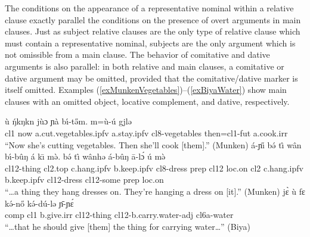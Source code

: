 \documentclass[10pt,twoside]{article}
\makeatletter
\def\ci#1{{\ipaFont #1}}
\newcommand{\gl}[1]{`#1'}
\newcommand{\cl}[1]{{\sc cl#1}}
\newcommand{\pref}[1]{(\ref{#1})}
\newcommand{\rref}[2]{\pref{#1}--\pref{#2}}
\def\ML#1{#1\symbol{"1DC6}} %
\def\LM{\textlowrise}
\newcommand\Lbi{\ipabar{\ipaclap{\i}{\rotatebox{0}{\emph{\raisebox{.06em}{\`{}}}}}}{.5ex}{1.1}{}{}}
\newcommand\Hbi{\ipabar{\ipaclap{\i}{\rotatebox{0}{\emph{\raisebox{.06em}{\'{}}}}}}{.5ex}{1.1}{}{}}
\renewcommand{\i}{ı}
\def\@{ə}
\def\eh{ɛ}
\def\aw{ɔ}
\def\ng{ŋ}
\def\ny{ɲ}
\makeatother
\begin{document}
The conditions on the appearance of a representative nominal
within a relative clause exactly parallel the conditions on the presence
of overt arguments in main clauses.
Just as subject relative clauses are the only type of relative clause which
must contain a representative nominal, subjects are the only argument
which is not omissible from a main clause.
The behavior of comitative and dative arguments is also parallel: in
both relative and main clauses, a comitative or dative argument may be
omitted, provided that the comitative/dative
%
marker is itself omitted. Examples \rref{exMunkenVegetables}{exBiyaWater}
show main clauses with an omitted object, locative complement, and dative,
respectively.
%
%
\begin{exe}
\ex \label{exMunkenVegetables}
\gll \`u {\'\ng}k\Hbi\ng{k\Lbi}n j\`u{\aw} \ny\`a b\'\i-t\H{\@}m. m=\`u-\'u gj\LM{\eh}l{\@}	\\
\cl1 now a.cut.vegetables.{\sc ipfv} a.stay.{\sc ipfv} \cl8-vegetables then=\cl1-{\sc fut} a.cook.{\sc irr}	\\
\glt ``Now she's cutting vegetables. Then she'll cook [them].'' (Munken) \label{mg04} %
\ex	\label{exMunkenDresses}
%
\gll \'a-\ny\H{\i} b\'{\@} t\^{\i} w\^an b\'\i-b\^u{\ng} \'a k\={\i} m\`{\@}. b\'{\@} t\^{\i} w\^anh{\@}
\'a-b\^u{\ng} \=a-l\'{\aw} \'u{\footnotemark}  m\`{\@}	\\
\cl12-thing \cl2.{\sc top} c.hang.{\sc ipfv} b.keep.{\sc ipfv} \cl8-dress {\sc prep} \cl12 {\sc loc.}on \cl2
c.hang.{\sc ipfv} b.keep.{\sc ipfv} \cl12-dress \cl12-some {\sc prep} {\sc loc.}on	\\
\glt ``\dots a thing they hang dresses on. They're hanging a dress on [it].'' (Munken)	%
%
\ex	\label{exBiyaWater}
\gll j\`{\eh} \`u f\ML{\eh} k\'{\@}-n\H{o} k\'{\@}-d\'u-l{\@} \={\ny}-\ny\'{\eh} 	\\
{\sc comp} \cl1 b.give.{\sc irr} \cl12-thing \cl12-b.carry.water-{\sc adj} \cl6a-water	\\
\glt ``\dots that he should give [them] the thing for carrying water\dots'' (Biya)	%
\end{exe}
%
%
\end{document}
